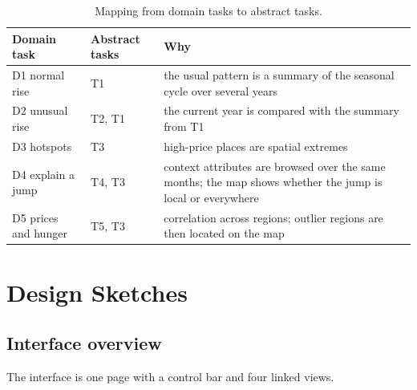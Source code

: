 \documentclass{article}
\begin{document}
\begin{table}[H]
  \centering
  \small
  \begin{tabularx}{\linewidth}{l l X}
    \hline
    \textbf{Domain task} & \textbf{Abstract tasks} & \textbf{Why} \\
    \hline
    D1 normal rise & T1 & the usual pattern is a summary of the seasonal cycle over several years \\
    D2 unusual rise & T2, T1 & the current year is compared with the summary from T1 \\
    D3 hotspots & T3 & high-price places are spatial extremes \\
    D4 explain a jump & T4, T3 & context attributes are browsed over the same months; the map shows whether the jump is local or everywhere \\
    D5 prices and hunger & T5, T3 & correlation across regions; outlier regions are then located on the map \\
    \hline
  \end{tabularx}
  \caption{Mapping from domain tasks to abstract tasks.}
  \label{tab:mapping}
\end{table}

\section{Design Sketches}

\subsection{Interface overview}

The interface is one page with a control bar and four linked views.
\end{document}
